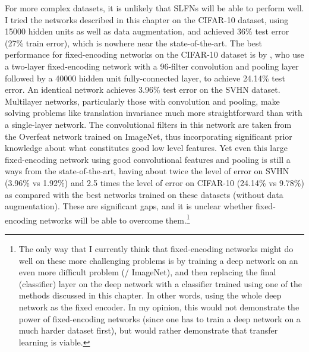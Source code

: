 For more complex datasets,
it is unlikely that SLFNs will be able to perform well.
I tried the networks described in this chapter on the CIFAR-10 dataset,
using 15000 hidden units as well as data augmentation,
and achieved 36\% test error (27\% train error),
which is nowhere near the state-of-the-art.
The best performance for fixed-encoding networks on the CIFAR-10 dataset
is by \textcite{McDonnell2015a},
who use a two-layer fixed-encoding network
with a 96-filter convolution and pooling layer
followed by a 40000 hidden unit fully-connected layer,
to achieve 24.14\% test error.
An identical network achieves 3.96\% test error on the SVHN dataset.
Multilayer networks, particularly those with convolution and pooling,
make solving problems like translation invariance
much more straightforward than with a single-layer network.
The convolutional filters in this network are taken from the Overfeat
network trained on ImageNet,
thus incorporating significant prior knowledge about what constitutes good
low level features.
Yet even this large fixed-encoding network
using good convolutional features and pooling
is still a ways from the state-of-the-art,
having about twice the level of error on SVHN (3.96\% vs 1.92\%)
and 2.5 times the level of error on CIFAR-10 (24.14\% vs 9.78\%)
as compared with the best networks trained on these datasets
(without data augmentation).
These are significant gaps,
and it is unclear whether fixed-encoding networks
will be able to overcome them.\footnote{
  The only way that I currently think that fixed-encoding networks
  might do well on these more challenging problems
  is by training a deep network on an even more difficult problem (\eg/ ImageNet),
  and then replacing the final (classifier) layer on the deep network
  with a classifier trained using one of the methods discussed in this chapter.
  In other words, using the whole deep network as the fixed encoder.
  In my opinion, this would not demonstrate
  the power of fixed-encoding networks
  (since one has to train a deep network on a much harder dataset first),
  but would rather demonstrate that transfer learning is viable.}




